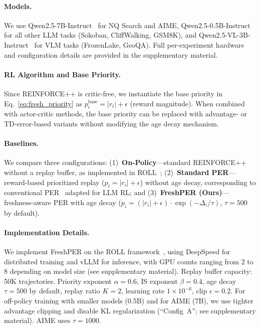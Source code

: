 \documentclass[runningheads]{llncs}
\newcommand{\method}{FreshPER}
\begin{document}
\paragraph{Models.}
We use Qwen2.5-7B-Instruct~\cite{qwen2.5} for NQ Search and AIME, Qwen2.5-0.5B-Instruct for all other LLM tasks (Sokoban, CliffWalking, GSM8K), and Qwen2.5-VL-3B-Instruct~\cite{qwen2.5vl} for VLM tasks (FrozenLake, GeoQA). Full per-experiment hardware and configuration details are provided in the supplementary material.

\paragraph{RL Algorithm and Base Priority.}
Since REINFORCE++ is critic-free, we instantiate the base priority in Eq.~\eqref{eq:fresh_priority} as $p_i^{\text{base}} = |r_i| + \epsilon$ (reward magnitude). When combined with actor-critic methods, the base priority can be replaced with advantage- or TD-error-based variants without modifying the age decay mechanism.

\paragraph{Baselines.}
We compare three configurations: (1)~\textbf{On-Policy}---standard REINFORCE++ without a replay buffer, as implemented in ROLL~\cite{wang2025roll}; (2)~\textbf{Standard PER}---reward-based prioritized replay ($p_i = |r_i| + \epsilon$) without age decay, corresponding to conventional PER~\cite{schaul2016per} adapted for LLM RL; and (3)~\textbf{\method{} (Ours)}---freshness-aware PER with age decay ($p_i = (|r_i| + \epsilon) \cdot \exp(-\Delta_i / \tau)$, $\tau{=}500$ by default).


\paragraph{Implementation Details.}
We implement \method{} on the ROLL framework~\cite{wang2025roll}, using DeepSpeed for distributed training and vLLM for inference, with GPU counts ranging from 2 to 8 depending on model size (see supplementary material). Replay buffer capacity: 50K trajectories. Priority exponent $\alpha{=}0.6$, IS exponent $\beta{=}0.4$, age decay $\tau{=}500$ by default, replay ratio $K{=}2$, learning rate $1{\times}10^{-6}$, clip $\epsilon{=}0.2$. For off-policy training with smaller models (0.5B) and for AIME (7B), we use tighter advantage clipping and disable KL regularization (``Config~A''; see supplementary material). AIME uses $\tau{=}1000$.
\end{document}
